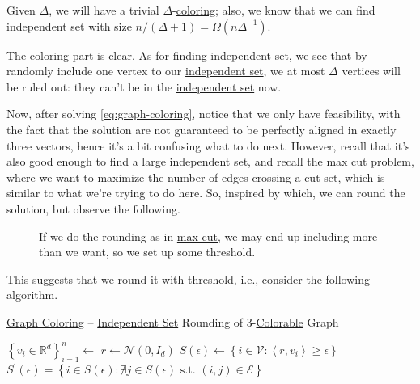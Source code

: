 \begin{remark}
	Given \(\Delta \), we will have a trivial \(\Delta \)-\hyperref[def:coloring]{coloring}; also, we know that we can find \hyperref[def:independent-set]{independent set} with size \(n / (\Delta +1) = \Omega (n \Delta ^{-1} )\).
\end{remark}
\begin{explanation}
	The coloring part is clear. As for finding \hyperref[def:independent-set]{independent set}, we see that by randomly include one vertex to our \hyperref[def:independent-set]{independent set}, we at most \(\Delta \) vertices will be ruled out: they can't be in the \hyperref[def:independent-set]{independent set} now.
\end{explanation}

Now, after solving \autoref{eq:graph-coloring}, notice that we only have feasibility, with the fact that the solution are not guaranteed to be perfectly aligned in exactly three vectors, hence it's a bit confusing what to do next. However, recall that it's also good enough to find a large \hyperref[def:independent-set]{independent set}, and recall the \hyperref[prb:max-cut]{max cut} problem, where we want to maximize the number of edges crossing a cut set, which is similar to what we're trying to do here. So, inspired by which, we can round the solution, but observe the following.

\begin{figure}[H]
	\centering
	\caption{If we do the rounding as in \hyperref[prb:max-cut]{max cut}, we may end-up including more than we want, so we set up some threshold.}
	\label{fig:3-coloring-threshold}
\end{figure}

This suggests that we round it with threshold, i.e., consider the following algorithm.

\begin{algorithm}[H]\label{algo:graph-coloring-independent-set}
	\DontPrintSemicolon
	\caption{\hyperref[prb:graph-coloring]{Graph Coloring} -- \hyperref[def:independent-set]{Independent Set} Rounding of \(3\)-\hyperref[def:coloring]{Colorable} Graph}
	\BlankLine
	\(\left\{ v_i \in \mathbb{R} ^d\right\} _{i=1}^n \gets\)\;
	\(r \gets \mathcal{N} (0, I_d)\)\label{algo:graph-coloring-independent-set-r}
	\(S(\epsilon )\gets\left\{ i\in \mathcal{V} \colon \left\langle r, v_i \right\rangle \geq \epsilon   \right\} \)
	\(S^\prime (\epsilon )= \left\{ i\in S(\epsilon )\colon \nexists j\in S(\epsilon ) \text{ s.t. } (i, j)\in \mathcal{E} \right\} \)
	\;
\end{algorithm}


